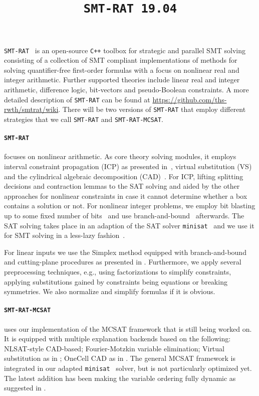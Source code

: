 \documentclass{article}
\title{\texttt{SMT-RAT 19.04}}
\begin{document}
\maketitle

\texttt{SMT-RAT}~\cite{Corzilius2015} is an open-source \texttt{C++} toolbox for strategic and parallel SMT solving
consisting of a collection of SMT compliant implementations of methods for
solving quantifier-free first-order formulas with a focus on nonlinear real and integer arithmetic.
Further supported theories include linear real and integer arithmetic, difference logic, bit-vectors and pseudo-Boolean constraints.
A more detailed description of \texttt{SMT-RAT} can be found at \href{https://github.com/ths-rwth/smtrat/wiki}{\color{blue}https://github.com/ths-rwth/smtrat/wiki}.
There will be two versions of \texttt{SMT-RAT} that employ different strategies that we call \texttt{SMT-RAT} and \texttt{SMT-RAT-MCSAT}.

\paragraph{\texttt{SMT-RAT}} focuses on nonlinear arithmetic.
As core theory solving modules, it employs interval constraint propagation (ICP) as presented in~\cite{GGIGSC10}, virtual substitution (VS)~\cite{Article_Corzilius_FCT2011} and the cylindrical algebraic decomposition (CAD)~\cite{Loup2013}. For ICP, lifting splitting decisions and contraction lemmas to the SAT solving and aided by the other approaches for nonlinear constraints in case it cannot determine whether a box contains a solution or not. For nonlinear integer problems, we employ bit blasting up to some fixed number of bits~\cite{kruger2015bitvectors} and use branch-and-bound~\cite{Kremer2016} afterwards.
The SAT solving takes place in an adaption of the SAT solver \texttt{minisat}~\cite{Een2003} and we use it for SMT solving in a less-lazy fashion~\cite{sebastiani2007lazy}.

For linear inputs we use the Simplex method equipped with branch-and-bound and cutting-plane procedures as presented in \cite{DM06}.
Furthermore, we apply several preprocessing techniques, e.g., using factorizations to simplify constraints, applying substitutions gained by constraints being equations or breaking symmetries. We also normalize and simplify formulas if it is obvious.

\paragraph{\texttt{SMT-RAT-MCSAT}} uses our implementation of the MCSAT framework \cite{Moura2013} that is still being worked on.
It is equipped with multiple explanation backends based on the following: NLSAT-style CAD-based; Fourier-Motzkin variable elimination; Virtual substitution as in \cite{Abraham2017}; OneCell CAD as in \cite{Neuss2018}.
The general MCSAT framework is integrated in our adapted \texttt{minisat}~\cite{Een2003} solver, but is not particularly optimized yet.
The latest addition has been making the variable ordering fully dynamic as suggested in \cite{Jovanovic2013}.
\end{document}
